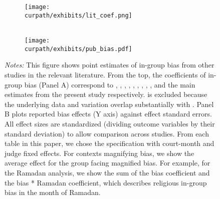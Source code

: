 \documentclass[12pt,english]{article}
\newcommand{\HOME}{\string~}
\newcommand{\curpath}{\HOME/ddl/justice-overleaf}
\newcommand{\curpath}{.}
\begin{document}
\begin{figure}%
  \begin{center}
    \caption{Comparison with judicial bias estimates in other contexts}
    \label{fig:literature}
    \begin{subfigure}{\textwidth}
     \\ \vspace{2mm} \\
    \texttt{[image: \\curpath/exhibits/lit\_coef.png]} \\ 
    \end{subfigure}
    \vspace{1cm}
    \begin{subfigure}{\textwidth}
     \\ 
    \texttt{[image: \\curpath/exhibits/pub\_bias.pdf]} \\
    \end{subfigure}
  \end{center}
   \begin{minipage}{1.0\textwidth}
   \scriptsize \emph{Notes:} This figure shows point estimates of in-group bias from other studies in the relevant literature. From the top, the coefficients of in-group bias (Panel A) correspond to \cite{grossman2016descriptive}, \cite{ShayoZussman2011QJE}, \cite{AnwarBayerHjalmarsson2012TQJoE}, 
    \cite{depew2017judges}, \cite{gazal2010let},
   \cite{knepper2018shadow}, \cite{sloane2019racial}, \cite{Didwania2018CLE}, \cite{lim2016judges}, and the main estimates from the present study respectively. \cite{shayo2017conflict} is excluded because the underlying data and variation overlap substantially with \cite{ShayoZussman2011QJE}. Panel B plots reported bias effects (Y axis) against effect standard errors. All effect sizes are standardized (dividing outcome variables by their standard deviation) to allow comparison across studies. From each table in this paper, we chose the specification with court-month and judge fixed effects. For contexts magnifying bias, we show the average effect for the group facing magnified bias. For example, for the Ramadan analysis, we show the sum of the bias coefficient and the bias * Ramadan coefficient, which describes religious in-group bias in the month of Ramadan.
   \par 
   \end{minipage}
\end{figure}
\end{document}
